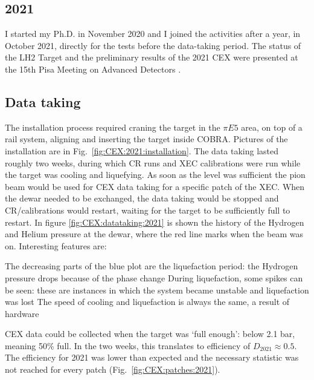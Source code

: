 \begin{refsection}
\section{2021}
    I started my Ph.D. in November 2020 and I joined the activities after a  year, in October 2021, directly for the tests before the data-taking period.
    The status of the LH2 Target and the preliminary results of the 2021 CEX were presented at the 15th Pisa Meeting on Advanced Detectors \cite{Elba:mio}.

    \subsection{Data taking}
        The installation process required craning the target in the $\pi E5$ area, on top of a rail system, aligning and inserting the target inside COBRA.
        Pictures of the installation are in Fig.~\ref{fig:CEX:2021:installation}.
        The data taking lasted roughly two weeks, during which CR runs and XEC calibrations were run while the target was cooling and liquefying. 
        As soon as the level was sufficient the pion beam would be used for CEX data taking for a specific patch of the XEC.  
        When the dewar needed to be exchanged, the data taking would be stopped and CR/calibrations would restart, waiting for the target to be sufficiently full to restart.
        \noindent
        In figure \ref{fig:CEX:datataking:2021} is shown the history of the Hydrogen and Helium pressure at the dewar, where the red line marks when the beam was on. 
        Interesting features are:
        \begin{outline}
            \1 The decreasing parts of the blue plot are the liquefaction period: the Hydrogen pressure drops because of the phase change
            \1 During liquefaction, some spikes can be seen: these are instances in which the system became unstable and liquefaction was lost
            \1 The speed of cooling and liquefaction is always the same, a result of hardware 
        \end{outline}
        CEX data could be collected when the target was `full enough': below 2.1 bar, meaning 50\% full. 
        In the two weeks, this translates to efficiency of $D_{2021}\approx0.5$.
        The efficiency for 2021 was lower than expected and the necessary statistic was not reached for every patch (Fig.~\ref{fig:CEX:patches:2021}).


\end{refsection}
